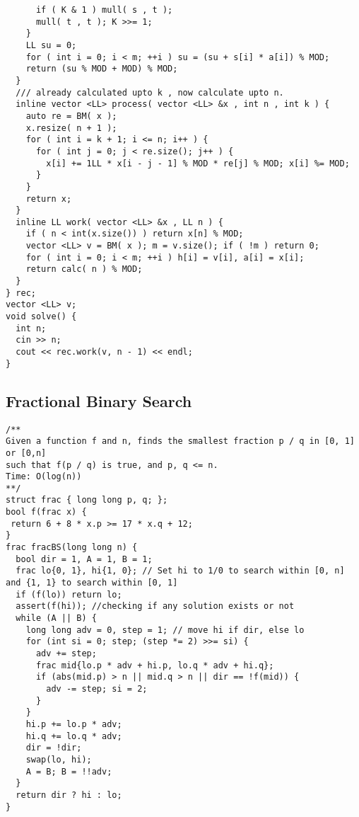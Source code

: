 \documentclass[FSZ,a4paper,onesided]{article}
\begin{document}
\begin{multicols*}{\COLS}
\begin{lstlisting}
      if ( K & 1 ) mull( s , t );
      mull( t , t ); K >>= 1;
    }
    LL su = 0;
    for ( int i = 0; i < m; ++i ) su = (su + s[i] * a[i]) % MOD;
    return (su % MOD + MOD) % MOD;
  }
  /// already calculated upto k , now calculate upto n.
  inline vector <LL> process( vector <LL> &x , int n , int k ) {
    auto re = BM( x );
    x.resize( n + 1 );
    for ( int i = k + 1; i <= n; i++ ) {
      for ( int j = 0; j < re.size(); j++ ) {
        x[i] += 1LL * x[i - j - 1] % MOD * re[j] % MOD; x[i] %= MOD;
      }
    }
    return x;
  }
  inline LL work( vector <LL> &x , LL n ) {
    if ( n < int(x.size()) ) return x[n] % MOD;
    vector <LL> v = BM( x ); m = v.size(); if ( !m ) return 0;
    for ( int i = 0; i < m; ++i ) h[i] = v[i], a[i] = x[i];
    return calc( n ) % MOD;
  }
} rec;
vector <LL> v;
void solve() {
  int n;
  cin >> n;
  cout << rec.work(v, n - 1) << endl;
}

\end{lstlisting}
\subsection{Fractional Binary Search}
\begin{lstlisting}
/**
Given a function f and n, finds the smallest fraction p / q in [0, 1] or [0,n]
such that f(p / q) is true, and p, q <= n.
Time: O(log(n))
**/
struct frac { long long p, q; };
bool f(frac x) {
 return 6 + 8 * x.p >= 17 * x.q + 12;
}
frac fracBS(long long n) {
  bool dir = 1, A = 1, B = 1;
  frac lo{0, 1}, hi{1, 0}; // Set hi to 1/0 to search within [0, n] and {1, 1} to search within [0, 1]
  if (f(lo)) return lo;
  assert(f(hi)); //checking if any solution exists or not
  while (A || B) {
    long long adv = 0, step = 1; // move hi if dir, else lo
    for (int si = 0; step; (step *= 2) >>= si) {
      adv += step;
      frac mid{lo.p * adv + hi.p, lo.q * adv + hi.q};
      if (abs(mid.p) > n || mid.q > n || dir == !f(mid)) {
        adv -= step; si = 2;
      } 
    }
    hi.p += lo.p * adv;
    hi.q += lo.q * adv;
    dir = !dir;
    swap(lo, hi);
    A = B; B = !!adv;
  }
  return dir ? hi : lo;
}
\end{lstlisting}

\end{multicols*}
\end{document}
